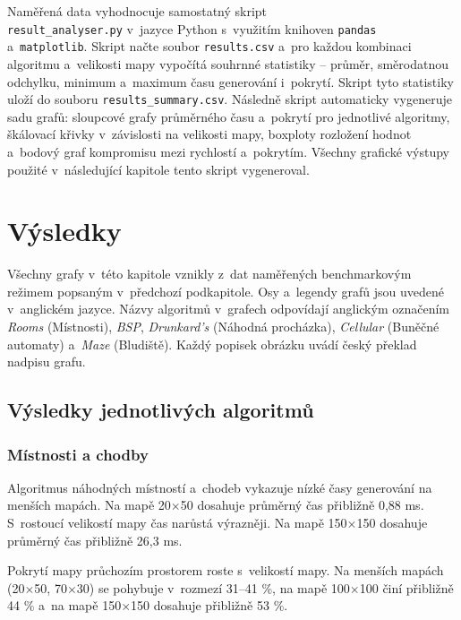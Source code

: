 \documentclass[
   program=itk,
   biblatex,
   figures=true,
   tables=true,
   glossaries,
   index
]{kidiplom}
\begin{document}
Naměřená data vyhodnocuje samostatný skript \\ \texttt{result\_analyser.py} v~jazyce Python s~využitím knihoven \texttt{pandas} \\ a~\texttt{matplotlib}. 
Skript načte soubor \texttt{results.csv} a~pro každou kombinaci algoritmu a~velikosti mapy vypočítá souhrnné statistiky -- průměr, směrodatnou odchylku, minimum a~maximum času generování i~pokrytí. Skript tyto statistiky uloží do souboru \texttt{results\_summary.csv}. Následně skript automaticky vygeneruje sadu grafů: sloupcové grafy průměrného času a~pokrytí pro jednotlivé algoritmy, škálovací křivky v~závislosti na velikosti mapy, boxploty rozložení hodnot a~bodový graf kompromisu mezi rychlostí a~pokrytím. Všechny grafické výstupy použité v~následující kapitole tento skript vygeneroval.

\section{Výsledky}

Všechny grafy v~této kapitole vznikly z~dat naměřených benchmarkovým režimem popsaným v~předchozí podkapitole. Osy a~legendy grafů jsou uvedené v~anglickém jazyce. Názvy algoritmů v~grafech odpovídají anglickým označením \textit{Rooms} (Místnosti), \textit{BSP}, \textit{Drunkard's} (Náhodná procházka), \textit{Cellular} (Buněčné automaty) a~\textit{Maze} (Bludiště). Každý popisek obrázku uvádí český překlad nadpisu grafu.


\subsection{Výsledky jednotlivých algoritmů}

\subsubsection{Místnosti a chodby}

Algoritmus náhodných místností a~chodeb vykazuje nízké časy generování na menších mapách. Na mapě 20$\times$50 dosahuje průměrný čas přibližně 0,88 ms. S~rostoucí velikostí mapy čas narůstá výrazněji. Na mapě 150$\times$150 dosahuje průměrný čas přibližně 26,3 ms.

Pokrytí mapy průchozím prostorem roste s~velikostí mapy. Na menších mapách (20$\times$50, 70$\times$30) se pohybuje v~rozmezí 31--41 \%, na mapě 100$\times$100 činí přibližně 44 \% a~na mapě 150$\times$150 dosahuje přibližně 53 \%.
\end{document}
